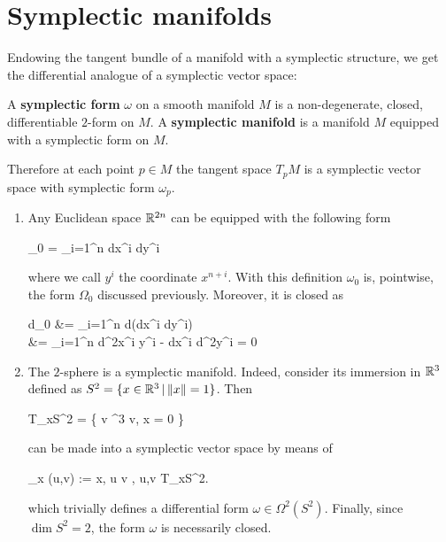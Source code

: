 \documentclass[main.tex]{subfiles}
\begin{document}
\section{Symplectic manifolds}
Endowing the tangent bundle of a manifold with a symplectic structure, we get the differential analogue of a symplectic vector space:

\begin{definition}
	A \textbf{symplectic form} $\omega$ on a smooth manifold $M$ is a non-degenerate\footnotemark, closed, differentiable $2$-form on $M$. A \textbf{symplectic manifold} is a manifold $M$ equipped with a symplectic form on $M$.
\end{definition}

Therefore at each point $p \in M$ the tangent space $T_pM$ is a symplectic vector space with symplectic form $\omega_p$.

\begin{example}
\label{ex:eu_sp_sphere}
	\leavevmode
	\begin{enumerate}
		\item Any Euclidean space $\mathbb{R}^{2n}$ can be equipped with the following form
		\begin{eqalign}
			\omega_0 = \sum_{i=1}^n dx^i \wedge dy^i
		\end{eqalign}
		where we call $y^i$ the coordinate $x^{n+i}$. With this definition $\omega_0$ is, pointwise, the form $\Omega_0$ discussed previously. Moreover, it is closed as
		\begin{eqalign}
			d\omega_0 &= \sum_{i=1}^n d(dx^i \wedge dy^i)\\
			&= \sum_{i=1}^n d^2x^i \wedge y^i - dx^i \wedge d^2y^i = 0
		\end{eqalign}
		\item The $2$-sphere is a symplectic manifold. Indeed, consider its immersion in $\mathbb{R}^3$ defined as $S^2 = \{ x \in \mathbb{R}^3 \,|\, \|x\| = 1\}$. Then
		\begin{eqalign}
			T_xS^2 = \{ v \in \R^3 \suchthat \langle v, x \rangle = 0 \}
		\end{eqalign}
		can be made into a symplectic vector space by means of
		\begin{eqalign}
			\omega_x (u,v) := \langle x, u \times v \rangle, \quad \forall u,v \in T_xS^2.
		\end{eqalign}
		which trivially defines a differential form $\omega \in \Omega^2(S^2)$. Finally, since $\dim S^2 = 2$, the form $\omega$ is necessarily closed.
	\end{enumerate}
\end{example}
\end{document}
